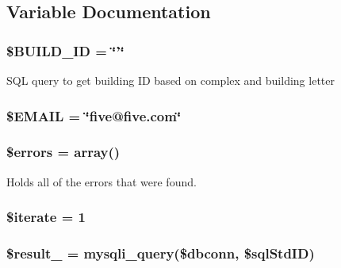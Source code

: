 \subsection{\-Variable \-Documentation}
\hypertarget{studentForm_8php_a4003cf8da4c94911cef7e69853cbac42}{
\subsubsection[{\$\-B\-U\-I\-L\-D\-\_\-\-I\-D}]{\setlength{\rightskip}{0pt plus 5cm}\$\-B\-U\-I\-L\-D\-\_\-\-I\-D = \char`\"{}'\char`\"{}}}\label{studentForm_8php_a4003cf8da4c94911cef7e69853cbac42}
\-S\-Q\-L query to get building \-I\-D based on complex and building letter \hypertarget{studentForm_8php_a47bae00d656c37ccabf3f0a6e8ca39ec}{
\subsubsection[{\$\-E\-M\-A\-I\-L}]{\setlength{\rightskip}{0pt plus 5cm}\$\-E\-M\-A\-I\-L = \char`\"{}five@five.\-com\char`\"{}}}\label{studentForm_8php_a47bae00d656c37ccabf3f0a6e8ca39ec}
\hypertarget{studentForm_8php_ab24faf4aa647cdcee494fc48524ad4ff}{
\subsubsection[{\$errors}]{\setlength{\rightskip}{0pt plus 5cm}\$errors = array()}}\label{studentForm_8php_ab24faf4aa647cdcee494fc48524ad4ff}
\-Holds all of the errors that were found. \hypertarget{studentForm_8php_a4747dd5778098fd12613d61e564cf58e}{
\subsubsection[{\$iterate}]{\setlength{\rightskip}{0pt plus 5cm}\$iterate = 1}}\label{studentForm_8php_a4747dd5778098fd12613d61e564cf58e}
\hypertarget{studentForm_8php_af4ecd7d330a614a9ff022fcccfd8df8a}{
\subsubsection[{\$result\-\_\-6}]{\setlength{\rightskip}{0pt plus 5cm}\$result\-\_ = mysqli\-\_\-query(\$dbconn, \$sql\-Std\-I\-D)}}\label{studentForm_8php_af4ecd7d330a614a9ff022fcccfd8df8a}
